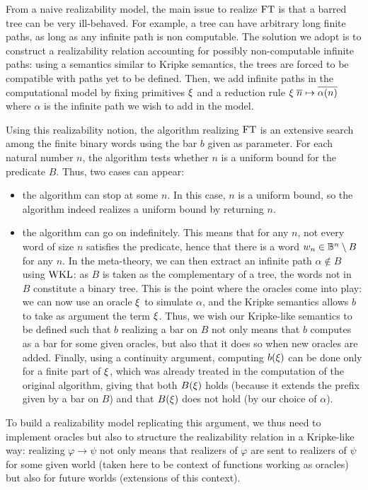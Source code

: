 \documentclass[a4paper,UKenglish,cleveref, autoref, thm-restate]{lipics-v2021}
\begin{document}

From a naive realizability model, the main issue to realize $\mathrm{FT}$ is
that a barred tree can be very ill-behaved.
For example, a tree can have arbitrary long finite paths,
as long as any infinite path is non computable.
The solution we adopt is to construct a realizability relation accounting
for possibly non-computable infinite paths:
using a semantics similar to Kripke semantics, the trees are forced to be
compatible with paths yet to be defined.
Then, we add infinite paths in the computational model by fixing
primitives $\xi$ and a reduction rule $\xi\;\overline{n} \mapsto \overline{\alpha(n)}$
where $\alpha$ is the infinite path we wish to add in the model.

Using this realizability notion, the algorithm realizing $\mathrm{FT}$ is an extensive
search among the finite binary words using the bar $b$ given as parameter.
For each natural number $n$, the algorithm tests whether $n$ is a uniform bound
for the predicate $B$.
Thus, two cases can appear:
\begin{itemize}
\item the algorithm can stop at some $n$.
In this case, $n$ is a uniform bound, so the algorithm indeed realizes a uniform bound by returning $n$.
\item the algorithm can go on indefinitely.
This means that for any $n$, not every word of size $n$ satisfies the predicate,
hence that there is a word $w_n\in \mathbb B^n \setminus B$ for any $n$.
In the meta-theory, we can then extract an infinite path $\alpha \notin B$
using $\mathrm{WKL}$: as $B$ is taken as the complementary of a tree, the words not in $B$ constitute a binary tree.
This is the point where the oracles come into play:
we can now use an oracle $\xi$ to simulate $\alpha$,
and the Kripke semantics allows $b$ to take as argument the term $\xi$.
Thus, we wish our Kripke-like semantics to be defined such that $b$ realizing a bar on $B$ not only means that $b$ computes as a bar for some given oracles, but also that it does so when new oracles are added. Finally, using a continuity argument, computing $b(\xi)$ can be done only for a finite part of $\xi$, which was already treated in the computation of the original algorithm, giving that both $B(\xi)$ holds (because it extends the prefix given by a bar on $B$) and that $B(\xi)$ does not hold (by our choice of $\alpha$).
\end{itemize}
To build a realizability model replicating this argument, we thus need to
implement oracles but also to structure the realizability relation
in a Kripke-like way: realizing $\varphi \to \psi$ not only means
that realizers of $\varphi$ are sent to realizers of $\psi$
for some given world (taken here to be context of functions working as oracles)
but also for future worlds (extensions of this context).
\end{document}
